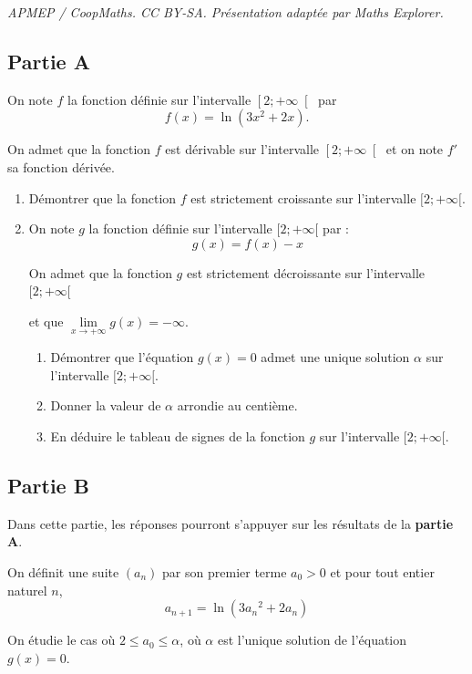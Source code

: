 \documentclass[10pt]{article}
\begin{document}
\noindent\textit{APMEP / CoopMaths. CC BY-SA. Présentation adaptée par Maths Explorer.}\par\medskip
\subsection*{Partie A}
On note $f$ la fonction définie sur l'intervalle $\left[2 ;+\infty\right[$ par \[f(x)=\ln \left(3 x^{2}+2 x\right).\]

On admet que la fonction $f$ est dérivable sur l'intervalle $\left[2 ; +\infty \right[$ et on note $f'$ sa fonction dérivée.

\begin{enumerate}
	\item Démontrer que la fonction $f$ est strictement croissante sur l'intervalle $[2 ;+\infty[$.

	\item On note $g$ la fonction définie sur l'intervalle $[2 ;+\infty[$ par :
	\[g(x)=f(x)-x\]

	On admet que la fonction $g$ est strictement décroissante sur l'intervalle $[2 ;+\infty[$

	et que $\lim\limits_{x \to +\infty} g(x)=-\infty$.

	\begin{enumerate}
		\item Démontrer que l'équation $g(x)=0$ admet une unique solution $\alpha$ sur l'intervalle $[2 ;+\infty[$.

		\item Donner la valeur de $\alpha$ arrondie au centième.

		\item En déduire le tableau de signes de la fonction $g$ sur l'intervalle $[2 ;+\infty[$.
	\end{enumerate}
\end{enumerate}

\subsection*{Partie B}
Dans cette partie, les réponses pourront s'appuyer sur les résultats de la \textbf{partie A}.

On définit une suite $(a_{n})$ par son premier terme $a_{0}>0$ et pour tout entier naturel $n$,
\[a_{n+1}=\ln \left(3 {a_{n}}^{2}+2 a_{n}\right)\]

On étudie le cas où \quad $2 \leqslant a_{0} \leqslant \alpha$, \quad où $\alpha$ est l'unique solution de l'équation $g(x)=0$.
\end{document}
